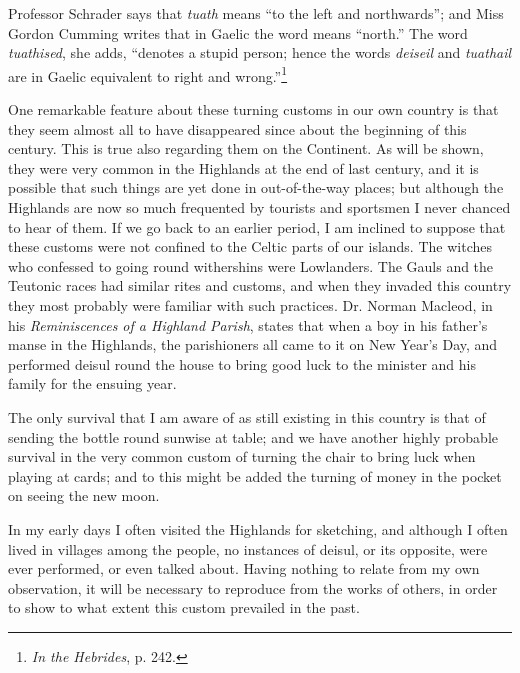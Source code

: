 \documentclass[a4paper, 11pt, oneside, polutonikogreek, english]{article}
\begin{document}
Professor Schrader says that \emph{tuath} means ``to the left and northwards''; and Miss Gordon Cumming writes that in Gaelic the word means ``north.'' The word \emph{tuathised}, she adds, ``denotes a stupid person; hence the words \emph{deiseil} and \emph{tuathail} are in Gaelic equivalent to right and wrong.''\footnote{\emph{In the Hebrides}, p. 242.}

One remarkable feature about these turning customs in our own country is that they seem almost all to have disappeared since about the beginning of this century. This is true also regarding them on the Continent. As will be shown, they were very common in the Highlands at the end of last century, and it is possible that such things are yet done in out-of-the-way places; but although the Highlands are now so much frequented by tourists and sportsmen I never chanced to hear of them. If we go back to an earlier period, I am inclined to suppose that these customs were not confined to the Celtic parts of our islands. The witches who confessed to going round withershins were Lowlanders. The Gauls and the Teutonic races had similar rites and customs, and when they invaded this country they most probably were familiar with such practices. Dr. Norman Macleod, in his \emph{Reminiscences of a Highland Parish}, states that when a boy in his father's manse in the Highlands, the parishioners all came to it on New Year's Day, and performed deisul round the house to bring good luck to the minister and his family for the ensuing year.

The only survival that I am aware of as still existing in this country is that of sending the bottle round sunwise at table; and we have another highly probable survival in the very common custom of turning the chair to bring luck when playing at cards; and to this might be added the turning of money in the pocket on seeing the new moon.

In my early days I often visited the Highlands for sketching, and although I often lived in villages among the people, no instances of deisul, or its opposite, were ever performed, or even talked about. Having nothing to relate from my own observation, it will be necessary to reproduce from the works of others, in order to show to what extent this custom prevailed in the past.
\end{document}
